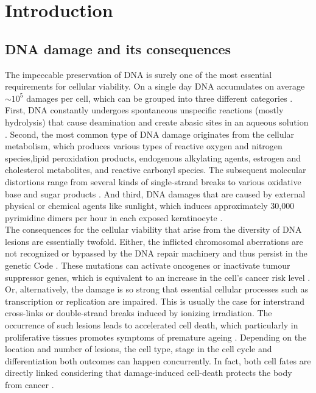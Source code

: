 \chapter{Introduction}
\pagestyle{plain}

\section{DNA damage and its consequences}

The impeccable preservation of DNA is surely one of the most essential requirements for cellular viability. On a single day DNA accumulates on average $\sim\text{10}^\text{5}$ damages per cell, which can be grouped into three different categories \cite{Hoeijmakers2009}. First, DNA constantly undergoes spontaneous unspecific reactions (mostly hydrolysis) that cause deamination and create abasic sites in an aqueous solution \cite{Lindahl1993,Lhomme1999}. Second, the most common type of DNA damage originates from the cellular metabolism, which produces various types of reactive oxygen and nitrogen species,lipid peroxidation products, endogenous alkylating agents, estrogen and cholesterol metabolites, and reactive carbonyl species. The subsequent molecular distortions range from several kinds of single-strand breaks to various oxidative base and sugar products \cite{DeBont2004,Sander2005}. And third, DNA damages that are caused by external physical or chemical agents like sunlight, which induces approximately 30,000 pyrimidine dimers per hour in each exposed keratinocyte \cite{Luijsterburg2010}.\\        
The consequences for the cellular viability that arise from the diversity of DNA lesions are essentially twofold. Either, the inflicted chromosomal aberrations are not recognized or bypassed by the DNA repair machinery and thus persist in the genetic Code \cite{Hoeijmakers2009}. These mutations can activate oncogenes or inactivate tumour suppressor genes, which is equivalent to an increase in the cell's cancer risk level \cite{Bartek2007}. Or, alternatively, the damage is so strong that essential cellular processes such as transcription or replication are impaired. This is usually the case for interstrand cross-links or double-strand breaks induced by ionizing irradiation. The occurrence of such lesions leads to accelerated cell death, which particularly in proliferative tissues promotes symptoms of premature ageing \cite{Marteijn2014}. Depending on the location and number of lesions, the cell type, stage in the cell cycle and differentiation both outcomes can happen concurrently. In fact, both cell fates are directly linked considering that damage-induced cell-death protects the body from cancer \cite{Hoeijmakers2009}.            

